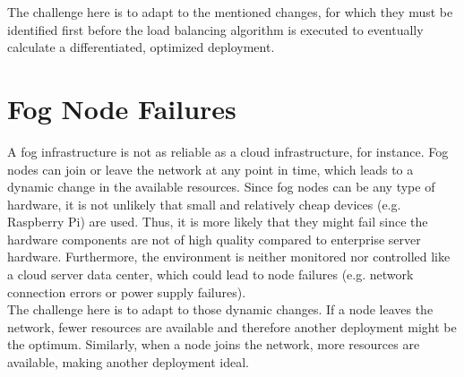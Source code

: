 The challenge here is to adapt to the mentioned changes, for which they must be identified first before the load balancing algorithm is executed to eventually calculate a differentiated, optimized deployment.

\section{Fog Node Failures}
A fog infrastructure is not as reliable as a cloud infrastructure, for instance.
Fog nodes can join or leave the network at any point in time, which leads to a dynamic change in the available resources.
Since fog nodes can be any type of hardware, it is not unlikely that small and relatively cheap devices (e.g. Raspberry Pi) are used.
Thus, it is more likely that they might fail since the hardware components are not of high quality compared to enterprise server hardware.
Furthermore, the environment is neither monitored nor controlled like a cloud server data center, which could lead to node failures (e.g. network connection errors or power supply failures).\\

The challenge here is to adapt to those dynamic changes.
If a node leaves the network, fewer resources are available and therefore another deployment might be the optimum.
Similarly, when a node joins the network, more resources are available, making another deployment ideal.
